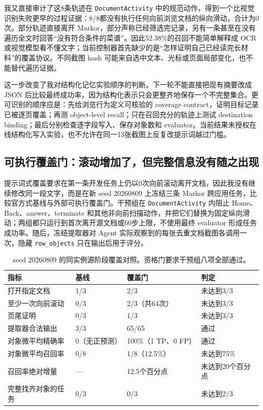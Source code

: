 \documentclass[12pt,a4paper]{ctexart}
\newcommand{\code}[1]{\texttt{#1}}
\begin{document}
我又直接审计了这8条轨迹在 \code{DocumentActivity} 中的规范动作，得到一个比视觉识别失败更早的过程证据：8/8都没有执行任何向前浏览文档的纵向滑动，合计为0次。部分轨迹直接离开 Markor，部分声称已经筛选完记录，另有一条甚至在没有遍历全文时回答“没有符合条件的菜谱”。因此52.38\%的召回不能简单解释成 OCR 或视觉模型看不懂文字；当前控制器首先缺少的是“怎样证明自己已经读完长材料”的覆盖协议。不同截图 hash 可能来自选中文本、光标或页面局部变化，也不能替代遍历证据。

这一步改变了我对结构化记忆实验顺序的判断。下一轮不能直接把现有摘要改成 JSON 后比较最终成功率，因为结构化表示只会更整齐地保存一个不完整集合。更可识别的顺序应是：先给浏览行为定义可核验的 coverage contract，证明目标记录已被逐页覆盖；再测 object-level recall；只在召回充分的轨迹上测试 destination binding；最后分别检查逐字段写入、保存对象数和 evaluator。当前结果未授权在线结构化写入实验，也不允许在同一13张截图上反复改提示词越过门槛。

\subsection{可执行覆盖门：滚动增加了，但完整信息没有随之出现}

提示词式覆盖要求在第一条开发任务上仍以0次向前滚动离开文档，因此我没有继续修改同一段文字，而是在新 seed 20260809 上冻结三条 Markor 跨应用任务，比较官方式基线与外部可执行覆盖门。干预组在 \code{DocumentActivity} 内阻止 Home、Back、answer、terminate 和其他非向前扫描动作，并把它们替换为固定纵向滑动；两组都只运行到首次离开源文档或60步上限，不使用最终 evaluator 形成任务成功率。随后，冻结提取器对 Agent 实际观察到的每张去重文档截图各调用一次，隐藏 \code{row\_objects} 只在输出后用于评分。

\begin{table}[H]
    \centering
    \caption{seed 20260809 的同实例源阶段覆盖对照。资格门要求干预组八项全部通过。}
    \label{tab:source-coverage-gate}
    \small
    \begin{tabularx}{\textwidth}{p{4.6cm}p{2.0cm}p{2.2cm}Y}
        \toprule
        指标 & 基线 & 覆盖门 & 判定 \\
        \midrule
        打开指定文档 & 1/3 & 2/3 & 未达到3/3 \\
        至少一次向前滚动 & 0/3 & 2/3（共64次） & 未达到3/3 \\
        页尾证明 & 0/3 & 1/3 & 未达到3/3 \\
        提取器合法输出 & 3/3 & 65/65 & 通过 \\
        对象微平均精确率 & 0（无正预测） & 100\%（1 TP、0 FP） & 通过 \\
        对象微平均召回率 & 0/8 & 1/8（12.5\%） & 未达到75\% \\
        召回率绝对增量 & --- & 12.5个百分点 & 未达到20个百分点 \\
        完整找齐对象的任务 & 0/3 & 0/3 & 未达到2/3 \\
        \bottomrule
    \end{tabularx}
\end{table}
\end{document}
